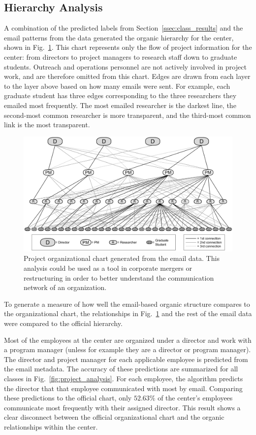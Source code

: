\documentclass[10pt,twocolumn,conference]{IEEEtran}
\begin{document}
\subsection{Hierarchy Analysis}
A combination of the predicted labels from Section~\ref{ssec:class_results} and the email patterns from the data generated the organic hierarchy for the center, shown in Fig.~\ref{fig:org_chart}.
This chart represents only the flow of project information for the center: from directors to project managers to research staff down to graduate students.
Outreach and operations personnel are not actively involved in project work, and are therefore omitted from this chart.
Edges are drawn from each layer to the layer above based on how many emails were sent.
For example, each graduate student has three edges corresponding to the three researchers they emailed most frequently.
The most emailed researcher is the darkest line, the second-most common researcher is more transparent, and the third-most common link is the most transparent.

\begin{figure}[t]
	\centering
	\includegraphics[width=\columnwidth,trim={0mm 1mm 0mm 1mm},clip]{org_chart_with_legend_no_red}
	\caption{Project organizational chart generated from the email data. This analysis could be used as a tool in corporate mergers or restructuring in order to better understand the communication network of an organization.}
	\label{fig:org_chart}
\end{figure}

To generate a measure of how well the email-based organic structure compares to the organizational chart, the relationships in Fig.~\ref{fig:org_chart} and the rest of the email data were compared to the official hierarchy.

Most of the employees at the center are organized under a director and work with a program manager (unless for example they are a director or program manager).
The director and project manager for each applicable employee is predicted from the email metadata.
The accuracy of these predictions are summarized for all classes in Fig.~\ref{fig:project_analysis}.
For each employee, the algorithm predicts the director that that employee communicated with most by email.
Comparing these predictions to the official chart, only $52.63\%$ of the center's employees communicate most frequently with their assigned director.
This result shows a clear disconnect between the official organizational chart and the organic relationships within the center.
\end{document}
